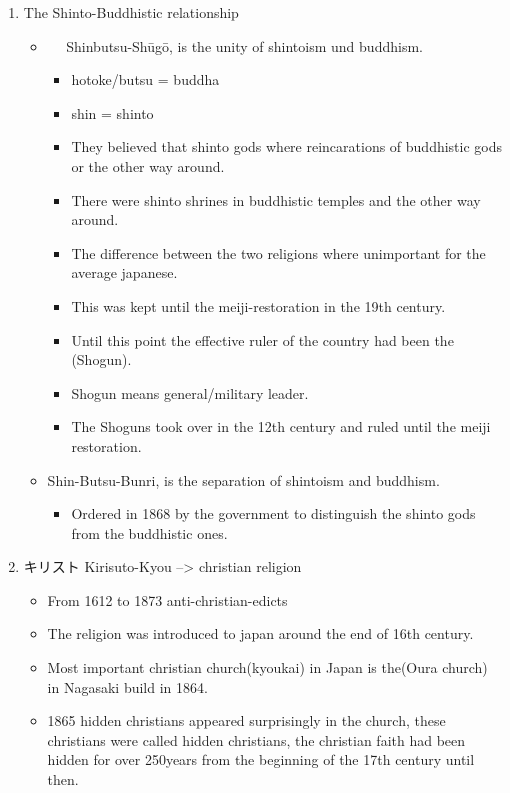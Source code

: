 \documentclass{article}
\newcommand\tabni[1][0.2cm]{\hspace*{#1}}
\begin{document}
\begin{enumerate}[itemsep=-6pt]
\item The Shinto-Buddhistic relationship
\begin{itemize}%
\item　 \tabni Shinbutsu-Shūgō, is the unity of shintoism und buddhism.
\begin{itemize}%
\item hotoke/butsu = buddha
\item shin = shinto
\item They believed that shinto gods where reincarations of buddhistic gods or the other way around.
\item There were shinto shrines in buddhistic temples and the other way around.
\item The difference between the two religions where unimportant for the average japanese.
\item This was kept until the meiji-restoration in the 19th century.
\item Until this point the effective ruler of the country had been the (Shogun).
\item Shogun means general/military leader.
\item The Shoguns took over in the 12th century and ruled until the meiji restoration.
\end{itemize}
\item {} \tabni Shin-Butsu-Bunri, is the separation of shintoism and buddhism.
\begin{itemize}
\item Ordered in 1868 by the government to distinguish the shinto gods from the buddhistic ones. \\
\end{itemize}
\end{itemize}
\item キリスト \tabni Kirisuto-Kyou --> christian religion
\begin{itemize}
\item From 1612 to 1873 anti-christian-edicts
\item The religion was introduced to japan around the end of 16th century.
\item Most important christian church(kyoukai) in Japan is the(Oura church) in Nagasaki build in 1864.
\item 1865 hidden christians appeared surprisingly in the church, these christians were called hidden christians, the christian faith had been hidden for over 250years from the beginning of the 17th century until then.

\end{itemize}
\end{enumerate}
\end{document}

